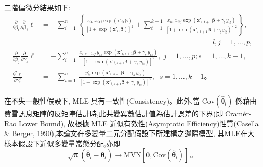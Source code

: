 \noindent 二階偏微分結果如下:
\begin{align*}
    \frac{\partial}{\partial \beta_l}\frac{\partial}{\partial \beta_j} \ell &= - \sum_{i=1}^n \, \left\{ \frac{x_{i1l}\, x_{i1j} \exp(\bm{x}'_{i1}\bm{\beta})}{[1+\exp(\bm{x}'_{i1}\bm{\beta})]^2} + \sum_{t=1}^{k-1} \, \frac{ x_{itl} \, x_{itj} \exp(\bm{x}'_{i,t+1}\bm{\beta} +\gamma_t \, y_{it})}{[1+\exp(\bm{x}'_{i,t+1}\bm{\beta} +\gamma_t \, y_{it})]^2} \right\},\\
             &\qquad\qquad\qquad\qquad\qquad\qquad\qquad\qquad\qquad\qquad\qquad\qquad l, j=1,\ldots,p, \\
    \frac{\partial}{\partial \beta_j}\frac{\partial}{\partial \gamma_s} \ell &= - \sum_{i=1}^n \,  \frac{x_{i,s+1,j} \, y_{is} \exp (\bm{x}'_{i,s+1}\bm{\beta} +\gamma_s \, y_{is})}{[1+ \exp (\bm{x}'_{i,s+1}\bm{\beta} +\gamma_s \, y_{is})]^2},\; j=1,\ldots,p; s=1,\ldots,k-1, \\
    \frac{\partial^2 \ell}{\partial \gamma^2_s} &= - \sum_{i=1}^n \, \frac{y^2_{is} \exp (\bm{x}'_{i,s+1}\bm{\beta} +\gamma_s \, y_{is})}{[1+ \exp (\bm{x}'_{i,s+1} \bm{\beta} +\gamma_s \, y_{is})]^2},\;\; s=1,\ldots,k-1\mbox{。}
\end{align*}

\noindent 在不失一般性假設下, MLE 具有一致性(Consistency)。此外,當 $\mbox{Cov}(\hat{\bm{\theta}}_l)$ 係藉由費雪訊息矩陣的反矩陣估計時,此共變異數估計值為估計誤差的下界(即 Cram\'{e}r-Rao Lower Bound),
故根據 MLE 近似有效性(Asymptotic Efficiency)性質(Casella $\&$ Berger, 1990),本論文在多變量二元分配假設下所建構之邊際模型,
其MLE在大樣本假設下近似多變量常態分配,亦即
    $$\sqrt{n}(\hat{\bm{\theta}}_l - \bm{\theta}_l) \rightarrow \mbox{MVN}[\bm{0},\mbox{Cov}(\hat{\bm{\theta}}_l)]\,\mbox{。} $$


%







